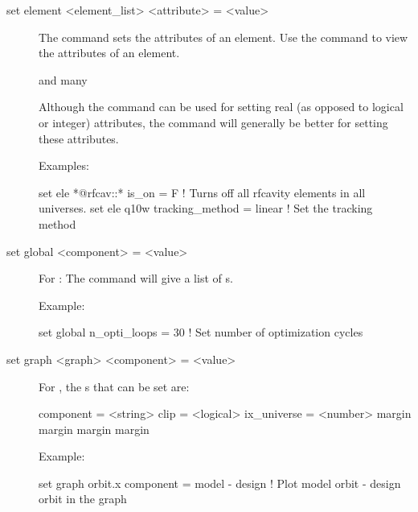 {{\begin{description}

\item[set element <element_list> <attribute> = <value>] \Newline
The  command sets the attributes of an element. Use the
 command to view the attributes of an element. 

 and  many


Although the  command can be used for setting real (as
opposed to logical or integer) attributes, the 
command will generally be better for setting these attributes.

Examples:
\begin{example}
  set ele *@rfcav::* is_on = F  ! Turns off all rfcavity elements in all universes.
  set ele q10w tracking_method = linear ! Set the tracking method
\end{example}


\item[set global <component> = <value>] \Newline
For : The  command will give a list of 
s.

Example:
\begin{example}
  set global n_opti_loops = 30  ! Set number of optimization cycles
\end{example}


\item[set graph <graph> <component> = <value>] \Newline
For , the s that can be set are:
\begin{example}
  component   = <string>
  clip        = <logical>
  ix_universe = <number>
  margin%
  margin%
  margin%
  margin%
\end{example}

Example:
\begin{example}
  set graph orbit.x component = model - design  
                          ! Plot model orbit - design orbit in the graph
\end{example}



\end{description}}}
